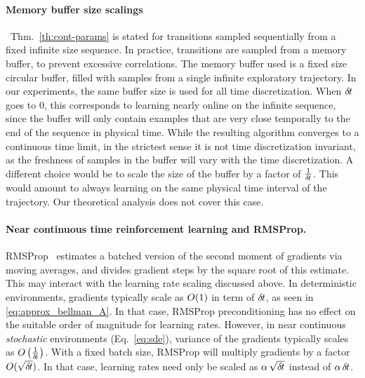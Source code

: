 \paragraph{Memory buffer size scalings}~Thm.~\ref{th:cont-params} is stated for
transitions sampled sequentially from a fixed infinite size sequence. In practice,
transitions are sampled from a memory buffer, to prevent excessive correlations.
The memory buffer used is a fixed size circular buffer, filled
with samples from a single infinite exploratory trajectory. In
our experiments, the same buffer size is used for all time discretization. When
${\delta\hspace{-.1em}t}$ goes to $0$, this corresponds to learning nearly online on the
infinite sequence, since the buffer will only contain examples that are very
close temporally to the end of the sequence in physical time.  While the resulting
algorithm converges to a continuous time limit, in the strictest sense it is not
time discretization invariant, as the freshness of samples in the buffer will
vary with the time discretization.
A different choice would be to scale the size of the buffer by a factor of
$\frac{1}{{\delta\hspace{-.1em}t}}$. This would amount to always learning on the same physical time interval of
the trajectory. Our theoretical analysis does not cover this case.

\paragraph{Near continuous time reinforcement learning and RMSProp.} RMSProp~\cite{rmsprop}
estimates a batched version of the second moment of gradients via moving
averages, and divides gradient steps by the square root of this estimate.
This may interact with the learning rate scaling discussed above. In
deterministic environments, gradients typically scale as $O(1)$ in
term of ${\delta\hspace{-.1em}t}$, as seen in \eqref{eq:approx_bellman_A}.  In that case, RMSProp
preconditioning has no effect on the suitable order of magnitude for learning
rates. However, in near continuous \emph{stochastic} environments (Eq.~\ref{eq:sde}), variance of the gradients typically scales as
$O\left(\frac{1}{{\delta\hspace{-.1em}t}}\right)$. With a fixed batch size,
RMSProp will multiply gradients by a factor $O(\sqrt{{\delta\hspace{-.1em}t}})$. In
that case,
learning rates need only be scaled as $\alpha \,\sqrt{{\delta\hspace{-.1em}t}}$ instead of
$\alpha \,{\delta\hspace{-.1em}t}$.

